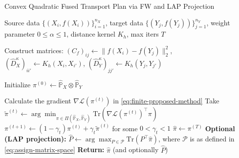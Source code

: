 \documentclass{article}
\begin{document}
\begin{algorithm}[t]
	\caption{Convex Quadratic Fused Transport Plan via FW and LAP Projection}
	\label{alg:proposed-algorithm}
	\begin{algorithmic}[1]
		\Require Source data $\{(X_i, f(X_i))\}_{i=1}^{n_X}$, target data $\{(Y_j, f(Y_j))\}_{j=1}^{n_Y}$, weight parameter $0 \leq \alpha \leq 1$, distance kernel $K_h$, max iters $T$
		
		\State Construct matrices:
		\Statex \hspace{\algorithmicindent} $(C_f)_{ij} \gets \|f(X_i)-f(Y_j)\|_2^2$, \quad
		$(\hat D_X^{\kappa})_{ii'} \gets K_h(X_i,X_{i'})$, \quad
		$(\hat D_Y^{\kappa})_{jj'} \gets K_h(Y_j,Y_{j'})$
		
		\State Initialize $\pi^{(0)} \gets \hat{\mathbb{P}}_X \otimes \hat{\mathbb{P}}_Y$
		
		\State Calculate the gradient $\nabla \mathcal{L}(\pi^{(t)})$ in \eqref{eq:finite-proposed-method}
		\State Take $\tilde{\pi}^{(t)} \gets \arg\min_{\pi \in \Pi(\hat{\mathbb{P}}_X,\hat{\mathbb{P}}_Y)} \mathrm{Tr}(\nabla \mathcal{L}(\pi^{(t)})^\top \pi)$
		\State $\pi^{(t+1)} \gets (1-\gamma_t)\pi^{(t)} + \gamma_t \tilde{\pi}^{(t)}$ for some $0 < \gamma_t < 1$
		\EndFor
		\State $\hat\pi \gets \pi^{(T)}$
		\State \textbf{Optional (LAP projection):} $\displaystyle
		\hat P \gets \arg\max_{P \in \mathcal{P}} \mathrm{Tr}(P^\top \hat\pi)$, where $\mathcal{P}$ is as defined in \eqref{eq:assign-matrix-space}
		\State \textbf{Return:} $\hat\pi$ (and optionally $\hat P$)
	\end{algorithmic}
\end{algorithm}








\end{document}
